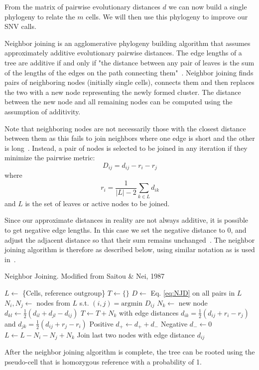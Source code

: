 \documentclass[../../main.tex]{subfiles}
\begin{document}
From the matrix of pairwise evolutionary distances $d$ we can now build a single phylogeny to relate the $m$ cells.
We will then use this phylogeny to improve our SNV calls.

Neighbor joining is an agglomerative phylogeny building algorithm that assumes approximately additive evolutionary pairwise distances.
The edge lengths of a tree are additive if and only if "the distance between any pair of leaves is the sum of the lengths of the edges on the path connecting them"~\cite{BSA}.
Neighbor joining finds pairs of neighboring nodes (initially single cells), connects them and then replaces the two with a new node representing the newly formed cluster.
The distance between the new node and all remaining nodes can be computed using the assumption of additivity.

Note that neighboring nodes are not necessarily those with the closest distance between them as this fails to join neighbors where one edge is short and the other is long~\cite{NJ, BSA}.
Instead, a pair of nodes is selected to be joined in any iteration if they minimize the pairwise metric:
\begin{equation}\label{eq:NJD}
    D_{ij} = d_{ij} - r_i - r_j
\end{equation}
where
\begin{equation*}
    r_i = \frac{1}{|L|-2}\sum_{k\in L}d_{ik}
\end{equation*}
and $L$ is the set of leaves or active nodes to be joined.

Since our approximate distances in reality are not always additive, it is possible to get negative edge lengths.
In this case we set the negative distance to 0, and adjust the adjacent distance so that their sum remains unchanged~\cite{negedge}.
The neighbor joining algorithm is therefore as described below, using similar notation as is used in~\cite{BSA}.

\begin{algorithm}
    \caption{Neighbor Joining. Modified from Saitou \& Nei, 1987}
    \begin{algorithmic}[5]
        \State $L\gets$ \{Cells, reference outgroup\}
        \State $T\gets\{\}$
            \State $D\gets$ Eq. \eqref{eq:NJD} on all pairs in $L$
            \State $N_i,N_j\gets$ nodes from $L$ s.t. $(i,j) = \text{argmin } D_{ij}$
            \State $N_k \gets$ new node
                \State $d_{kl} \gets \frac{1}{2}\left(d_{il} + d_{jl} - d_{ij}\right)$
            \EndFor
            \State $T \gets T + N_k$ with edge distances $d_{ik} = \frac{1}{2}\left(d_{ij}+r_i-r_j\right)$ and $d_{jk} = \frac{1}{2}\left(d_{ij}+r_j-r_i\right)$
                \State Positive $d_+\gets d_+ + d_-$ 
                \State Negative $d_-\gets 0$ 
            \EndIf
            \State $L \gets L -N_i -N_j + N_k$
        \EndWhile
        \State Join last two nodes with edge distance $d_{ij}$
    \end{algorithmic}
\end{algorithm}

After the neighbor joining algorithm is complete, the tree can be rooted using the pseudo-cell that is homozygous reference with a probability of 1.
\end{document}
